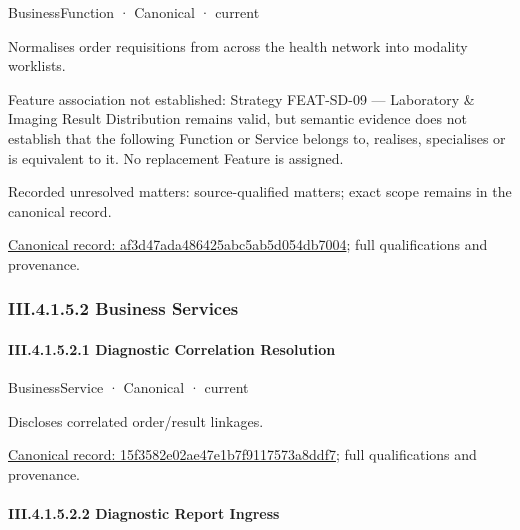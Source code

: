 \label{element:af3d47ada486425abc5ab5d054db7004}
{\small BusinessFunction · Canonical · current}\par

Normalises order requisitions from across the health network into modality worklists.



Feature association not established: Strategy FEAT-SD-09 — Laboratory \& Imaging Result Distribution remains valid, but semantic evidence does not establish that the following Function or Service belongs to, realises, specialises or is equivalent to it. No replacement Feature is assigned.


{\small Recorded unresolved matters: source-qualified matters; exact scope remains in the canonical record.}\par
{\footnotesize \href{../../../../../../../continuum/business/business-function/af3d47ada486425abc5ab5d054db7004.md}{Canonical record: af3d47ada486425abc5ab5d054db7004}; full qualifications and provenance.}\par
\subsubsection*{III.4.1.5.2 Business Services}
\label{navigation:III.4.1.5.2}

\paragraph*{III.4.1.5.2.1 Diagnostic Correlation Resolution}
\label{navigation:III.4.1.5.2.1}

\label{element:15f3582e02ae47e1b7f9117573a8ddf7}
{\small BusinessService · Canonical · current}\par

Discloses correlated order/result linkages.


{\footnotesize \href{../../../../../../../continuum/business/business-service/15f3582e02ae47e1b7f9117573a8ddf7.md}{Canonical record: 15f3582e02ae47e1b7f9117573a8ddf7}; full qualifications and provenance.}\par
\paragraph*{III.4.1.5.2.2 Diagnostic Report Ingress}
\label{navigation:III.4.1.5.2.2}

